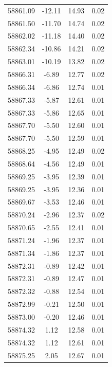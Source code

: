 \begin{longtable}{|c|c|c|c|}
 58861.09 &  -12.11 &       14.93 &          0.02 \\
 58861.50 &  -11.70 &       14.74 &          0.02 \\
 58862.02 &  -11.18 &       14.40 &          0.02 \\
 58862.34 &  -10.86 &       14.21 &          0.02 \\
 58863.01 &  -10.19 &       13.82 &          0.02 \\
 58866.31 &   -6.89 &       12.77 &          0.02 \\
 58866.34 &   -6.86 &       12.74 &          0.01 \\
 58867.33 &   -5.87 &       12.61 &          0.01 \\
 58867.33 &   -5.86 &       12.65 &          0.01 \\
 58867.70 &   -5.50 &       12.60 &          0.01 \\
 58867.70 &   -5.50 &       12.59 &          0.01 \\
 58868.25 &   -4.95 &       12.49 &          0.02 \\
 58868.64 &   -4.56 &       12.49 &          0.01 \\
 58869.25 &   -3.95 &       12.39 &          0.01 \\
 58869.25 &   -3.95 &       12.36 &          0.01 \\
 58869.67 &   -3.53 &       12.46 &          0.01 \\
 58870.24 &   -2.96 &       12.37 &          0.02 \\
 58870.65 &   -2.55 &       12.41 &          0.01 \\
 58871.24 &   -1.96 &       12.37 &          0.01 \\
 58871.34 &   -1.86 &       12.37 &          0.01 \\
 58872.31 &   -0.89 &       12.42 &          0.01 \\
 58872.31 &   -0.89 &       12.47 &          0.01 \\
 58872.32 &   -0.88 &       12.54 &          0.01 \\
 58872.99 &   -0.21 &       12.50 &          0.01 \\
 58873.00 &   -0.20 &       12.46 &          0.01 \\
 58874.32 &    1.12 &       12.58 &          0.01 \\
 58874.32 &    1.12 &       12.61 &          0.01 \\
 58875.25 &    2.05 &       12.67 &          0.01 \\

\end{longtable}
